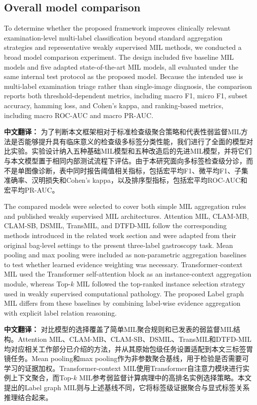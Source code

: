\documentclass[Afour,sagev,times]{sagej}
\begin{document}
\subsection{Overall model comparison}
To determine whether the proposed framework improves clinically relevant examination-level multi-label classification beyond standard aggregation strategies and representative weakly supervised MIL methods, we conducted a broad model comparison experiment. The design included five baseline MIL models and five adapted state-of-the-art MIL models, all evaluated under the same internal test protocol as the proposed model. Because the intended use is multi-label examination triage rather than single-image diagnosis, the comparison reports both threshold-dependent metrics, including macro F1, micro F1, subset accuracy, hamming loss, and Cohen's kappa, and ranking-based metrics, including macro ROC-AUC and macro PR-AUC.

\textbf{中文翻译：} 为了判断本文框架相对于标准检查级聚合策略和代表性弱监督MIL方法是否能够提升具有临床意义的检查级多标签分类性能，我们进行了全面的模型对比实验。实验设计纳入五种基础MIL模型和五种改造后的先进MIL模型，并将它们与本文模型置于相同内部测试流程下评估。由于本研究面向多标签检查级分诊，而不是单图像诊断，表中同时报告阈值相关指标，包括宏平均F1、微平均F1、子集准确率、汉明损失和Cohen's kappa，以及排序型指标，包括宏平均ROC-AUC和宏平均PR-AUC。

The compared models were selected to cover both simple MIL aggregation rules and published weakly supervised MIL architectures. Attention MIL, CLAM-MB, CLAM-SB, DSMIL, TransMIL, and DTFD-MIL follow the corresponding methods introduced in the related work section and were adapted from their original bag-level settings to the present three-label gastroscopy task. Mean pooling and max pooling were included as non-parametric aggregation baselines to test whether learned evidence weighting was necessary. Transformer-context MIL used the Transformer self-attention block as an instance-context aggregation module,\cite{R21} whereas Top-$k$ MIL followed the top-ranked instance selection strategy used in weakly supervised computational pathology.\cite{R22} The proposed Label graph MIL differs from these baselines by combining label-wise evidence aggregation with explicit label relation reasoning.

\textbf{中文翻译：} 对比模型的选择覆盖了简单MIL聚合规则和已发表的弱监督MIL结构。Attention MIL、CLAM-MB、CLAM-SB、DSMIL、TransMIL和DTFD-MIL均对应相关工作部分已介绍的方法，并从其原始包级任务设置适配到本文三标签胃镜任务。Mean pooling和max pooling作为非参数聚合基线，用于检验是否需要可学习的证据加权。Transformer-context MIL使用Transformer自注意力模块进行实例上下文聚合，而Top-$k$ MIL参考弱监督计算病理中的高排名实例选择策略。本文提出的Label graph MIL则与上述基线不同，它将标签级证据聚合与显式标签关系推理结合起来。
\end{document}
